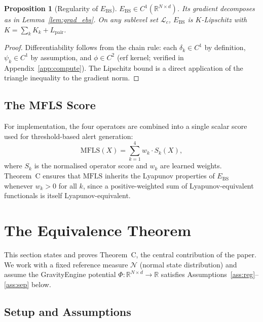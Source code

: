 \documentclass[11pt]{article}
\newtheorem{proposition}[theorem]{Proposition}
\theoremstyle{definition}
\newcommand{\R}{\mathbb{R}}
\newcommand{\Ebs}{E_{\mathrm{BS}}}
\newcommand{\Lpair}{L_{\mathrm{pair}}}
\begin{document}
\begin{proposition}[Regularity of $\Ebs$]
\label{prop:ebs_reg}
$\Ebs \in C^1(\R^{N \times d})$.  Its gradient decomposes as in
Lemma~\ref{lem:grad_ebs}.  On any sublevel set $\mathcal{L}_c$,
$\Ebs$ is $K$-Lipschitz with $K = \sum_k K_k + \Lpair$.
\end{proposition}

\begin{proof}
Differentiability follows from the chain rule: each $\delta_k \in C^1$ by
definition, $\psi_k \in C^1$ by assumption, and $\phi \in C^2$ (erf kernel;
verified in Appendix~\ref{app:compute}).  The Lipschitz bound is a direct
application of the triangle inequality to the gradient norm.
\end{proof}

\subsection{The MFLS Score}

For implementation, the four operators are combined into a single scalar score
used for threshold-based alert generation:
\begin{equation}\label{eq:mfls}
  \mathrm{MFLS}(X) = \sum_{k=1}^{4} w_k \cdot S_k(X),
\end{equation}
where $S_k$ is the normalised operator score and $w_k$ are learned weights.
Theorem~C ensures that $\mathrm{MFLS}$ inherits the Lyapunov properties of $\Ebs$
whenever $w_k > 0$ for all $k$, since a positive-weighted sum of Lyapunov-equivalent
functionals is itself Lyapunov-equivalent.

\section{The Equivalence Theorem}
\label{sec:equiv}

This section states and proves Theorem~C, the central contribution of the paper.
We work with a fixed reference measure $\mathcal{N}$ (normal state distribution)
and assume the GravityEngine potential $\Phi : \R^{N\times d}\to\R$ satisfies
Assumptions~\ref{ass:reg}--\ref{ass:sep} below.

\subsection{Setup and Assumptions}
\label{sec:equiv:setup}
\end{document}
